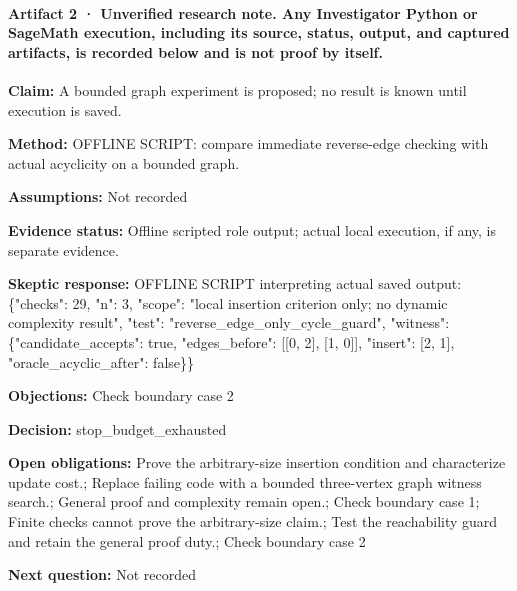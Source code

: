 \documentclass[11pt]{article}
\begin{document}
\paragraph{Artifact 2 · Unverified research note. Any Investigator Python or SageMath execution, including its source, status, output, and captured artifacts, is recorded below and is not proof by itself.}
\textbf{Claim:} A bounded graph experiment is proposed; no result is known until execution is saved.\par
\textbf{Method:} OFFLINE SCRIPT: compare immediate reverse-edge checking with actual acyclicity on a bounded graph.\par
\textbf{Assumptions:} Not recorded\par
\textbf{Evidence status:} Offline scripted role output; actual local execution, if any, is separate evidence.\par
\textbf{Skeptic response:} OFFLINE SCRIPT interpreting actual saved output: \{"checks": 29, "n": 3, "scope": "local insertion criterion only; no dynamic complexity result", "test": "reverse\_edge\_only\_cycle\_guard", "witness": \{"candidate\_accepts": true, "edges\_before": [[0, 2], [1, 0]], "insert": [2, 1], "oracle\_acyclic\_after": false\}\}\par
\textbf{Objections:} Check boundary case 2\par
\textbf{Decision:} stop\_budget\_exhausted\par
\textbf{Open obligations:} Prove the arbitrary-size insertion condition and characterize update cost.; Replace failing code with a bounded three-vertex graph witness search.; General proof and complexity remain open.; Check boundary case 1; Finite checks cannot prove the arbitrary-size claim.; Test the reachability guard and retain the general proof duty.; Check boundary case 2\par
\textbf{Next question:} Not recorded\par
\end{document}
